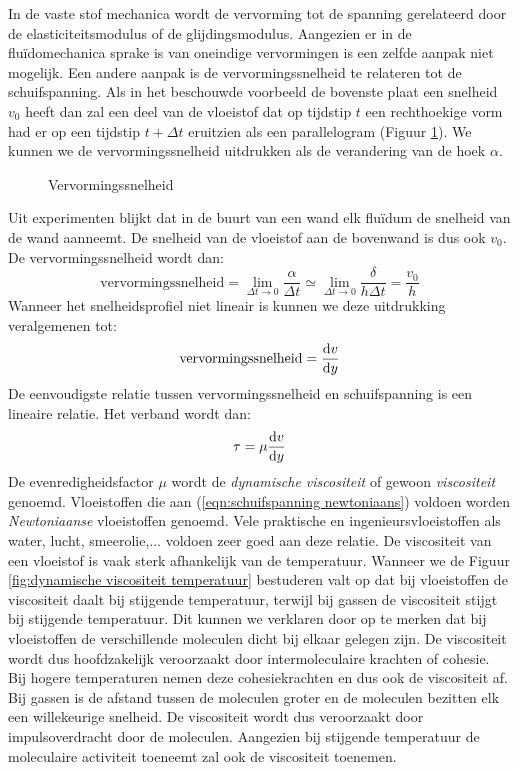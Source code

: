 In de vaste stof mechanica wordt de vervorming tot de spanning gerelateerd door de elasticiteitsmodulus of de glijdingsmodulus. Aangezien er in de flu\"idomechanica sprake is van oneindige vervormingen is een zelfde aanpak niet mogelijk. Een andere aanpak is de vervormingssnelheid te relateren tot de schuifspanning. Als in het beschouwde voorbeeld de bovenste plaat een snelheid $v_0$ heeft dan zal een deel van de vloeistof dat op tijdstip $t$ een rechthoekige vorm had er op een tijdstip $t+\Delta t$ eruitzien als een parallelogram (Figuur \ref{fig:Vervormingssnelheid}). We kunnen we de vervormingssnelheid uitdrukken als de verandering van de hoek $\alpha$.
\begin{figure}[htb]
	\centering
	
	\caption{Vervormingssnelheid}
	\label{fig:Vervormingssnelheid}
\end{figure}
Uit experimenten blijkt dat in de buurt van een wand elk flu\"idum de snelheid van de wand aanneemt. De snelheid van de vloeistof aan de bovenwand is dus ook $v_0$. De vervormingssnelheid wordt dan:
\begin{equation}
	\text{vervormingssnelheid} = \lim_{\Delta t \to 0} \frac{\alpha}{\Delta t} \simeq \lim_{\Delta t \to 0} \frac{\delta}{h \Delta t} = \frac{v_0}{h}
\end{equation}
Wanneer het snelheidsprofiel niet lineair is kunnen we deze uitdrukking veralgemenen tot:
\begin{equation}
	\text{vervormingssnelheid} = \frac{\mathrm{d} v}{\mathrm{d} y}
\end{equation}
De eenvoudigste relatie tussen vervormingssnelheid en schuifspanning is een lineaire relatie. Het verband wordt dan:
\begin{equation}
	\tau = \mu \frac{\mathrm{d} v}{\mathrm{d} y}
	\label{eqn:schuifspanning newtoniaans}
\end{equation}
De evenredigheidsfactor $\mu$ wordt de \emph{dynamische viscositeit} of gewoon \emph{viscositeit} genoemd. Vloeistoffen die aan (\ref{eqn:schuifspanning newtoniaans}) voldoen worden \emph{Newtoniaanse} vloeistoffen genoemd. Vele praktische en ingenieursvloeistoffen als water, lucht, smeerolie,... voldoen zeer goed aan deze relatie.
\npar
De viscositeit van een vloeistof is vaak sterk afhankelijk van de temperatuur. Wanneer we de Figuur \ref{fig:dynamische viscositeit temperatuur} bestuderen valt op dat bij vloeistoffen de viscositeit daalt bij stijgende temperatuur, terwijl bij gassen de viscositeit stijgt bij stijgende temperatuur. Dit kunnen we verklaren door op te merken dat bij vloeistoffen de verschillende moleculen dicht bij elkaar gelegen zijn. De viscositeit wordt dus hoofdzakelijk veroorzaakt door intermoleculaire krachten of cohesie. Bij hogere temperaturen nemen deze cohesiekrachten en dus ook de viscositeit af. Bij gassen is de afstand tussen de moleculen groter en de moleculen bezitten elk een willekeurige snelheid. De viscositeit wordt dus veroorzaakt door impulsoverdracht door de moleculen. Aangezien bij stijgende temperatuur de moleculaire activiteit toeneemt zal ook de viscositeit toenemen.
